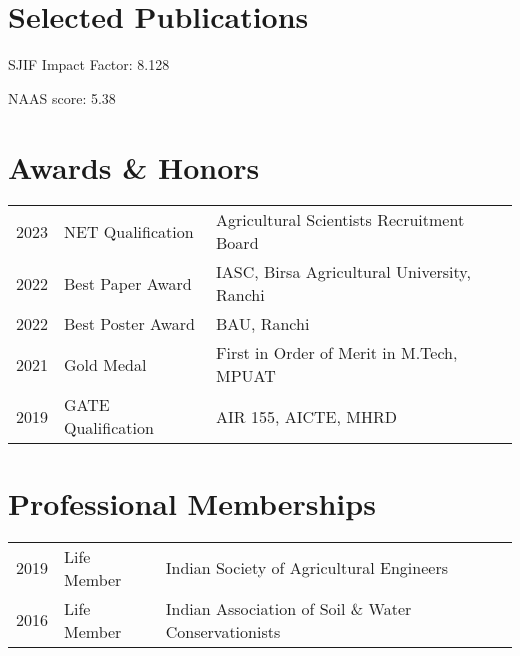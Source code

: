 \documentclass[]{deedy-resume-openfont}
\begin{document}
\begin{minipage}[t]{0.66\textwidth}
\section{Selected Publications}
SJIF Impact Factor: 8.128
\sectionsep

NAAS score: 5.38
\sectionsep


\section{Awards \& Honors} 
\begin{tabular}{rll}
2023	     & NET Qualification & Agricultural Scientists Recruitment Board\\
2022	     & Best Paper Award & IASC, Birsa Agricultural University, Ranchi\\
2022	     & Best Poster Award & BAU, Ranchi\\
2021	     & Gold Medal & First in Order of Merit in M.Tech, MPUAT\\
2019	     & GATE Qualification & AIR 155, AICTE, MHRD\\
\end{tabular}
\sectionsep


\section{Professional Memberships} 
\begin{tabular}{rll}
2019 & Life Member & Indian Society of Agricultural Engineers\\
2016 & Life Member & Indian Association of Soil \& Water Conservationists\\
\end{tabular}
\sectionsep

\end{minipage} 
\end{document}
